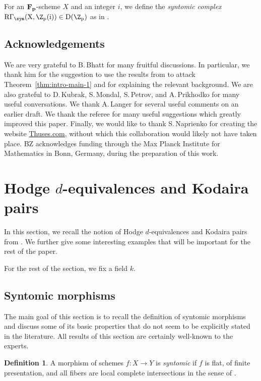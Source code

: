 \documentclass[11pt,reqno]{amsart}
\numberwithin{equation}{section}
\theoremstyle{definition}
\newtheorem{defn}[thm]{Definition}
\begin{document}
For an $\bf{F}_p$-scheme $X$ and an integer $i$, we define the {\it syntomic complex} $\rm{R}\Gamma_\syn(X, \Z_p(i))\in D(\Z_p)$ as in \cite[Variant 7.4.12]{Bhatt-Lurie}.

\subsection{Acknowledgements} 
We are very grateful to B.\,Bhatt for many fruitful discussions. In particular, we thank him for the suggestion to use the results from \cite{BMS2} to attack Theorem~\ref{thm:intro-main-1} and for explaining the relevant background. We are also grateful to D.\,Kubrak, S.\,Mondal, S.\,Petrov, and A.\,Prikhodko for many useful conversations. We thank A.\,Langer for several useful comments on an earlier draft. We thank the referee for many useful suggestions which greatly improved this paper. Finally, we would like to thank S.\,Naprienko for creating the website \href{https://thuses.com/}{Thuses.com}, without which this collaboration would likely not have taken place. BZ acknowledges funding through the Max Planck Institute for
Mathematics in Bonn, Germany, during the preparation of this work.





\section{Hodge $d$-equivalences and Kodaira pairs}

In this section, we recall the notion of Hodge $d$-equivalences and Kodaira pairs from \cite[]{ABM}. We further give some interesting examples that will be important for the rest of the paper. \smallskip

For the rest of the section, we fix a field $k$.


\subsection{Syntomic morphisms}\label{section:pro-syntomic}

The main goal of this section is to recall the definition of syntomic morphisms and discuss some of its basic properties that do not seem to be explicitly stated in the literature. All results of this section are certainly well-known to the experts. \smallskip

\begin{defn}{\cite[\href{https://stacks.math.columbia.edu/tag/00SL}{Tag 00SL}]{stacks-project}}\label{defn:syntomic-schemes} A morphism of schemes $f\colon X \to Y$ is {\it syntomic} if $f$ is flat, of finite presentation, and all fibers are local complete intersections in the sense of \cite[\href{https://stacks.math.columbia.edu/tag/00S9}{Tag 00S9}]{stacks-project}.
\end{defn}
\end{document}
